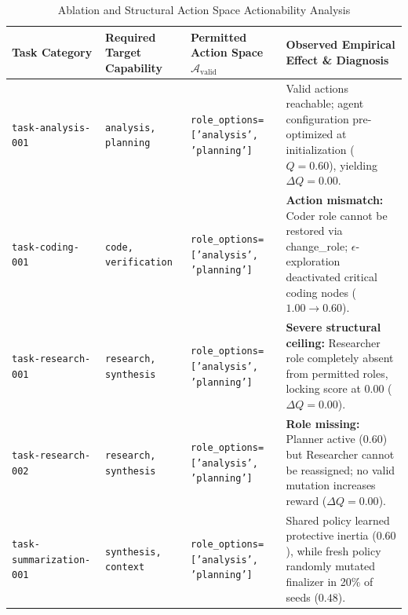 \begin{table}[!t]
\centering
\caption{Ablation and Structural Action Space Actionability Analysis}
\label{tab:action_space_ablation}
\footnotesize
\begin{tabular}{lp{3.5cm}p{4.2cm}p{4.5cm}}
\toprule
\textbf{Task Category} & \textbf{Required Target Capability} & \textbf{Permitted Action Space $\mathcal{A}_{\mathrm{valid}}$} & \textbf{Observed Empirical Effect \& Diagnosis} \\
\midrule
\texttt{task-analysis-001} & \texttt{analysis, planning} & \texttt{role\_options=['analysis', 'planning']} & Valid actions reachable; agent configuration pre-optimized at initialization ($Q=0.60$), yielding $\Delta Q = 0.00$. \\
\texttt{task-coding-001} & \texttt{code, verification} & \texttt{role\_options=['analysis', 'planning']} & \textbf{Action mismatch:} Coder role cannot be restored via change\_role; $\epsilon$-exploration deactivated critical coding nodes ($1.00 \to 0.60$). \\
\texttt{task-research-001} & \texttt{research, synthesis} & \texttt{role\_options=['analysis', 'planning']} & \textbf{Severe structural ceiling:} Researcher role completely absent from permitted roles, locking score at $0.00$ ($\Delta Q = 0.00$). \\
\texttt{task-research-002} & \texttt{research, synthesis} & \texttt{role\_options=['analysis', 'planning']} & \textbf{Role missing:} Planner active ($0.60$) but Researcher cannot be reassigned; no valid mutation increases reward ($\Delta Q = 0.00$). \\
\texttt{task-summarization-001} & \texttt{synthesis, context} & \texttt{role\_options=['analysis', 'planning']} & Shared policy learned protective inertia ($0.60$), while fresh policy randomly mutated finalizer in 20\% of seeds ($0.48$). \\
\bottomrule
\end{tabular}
\end{table}
